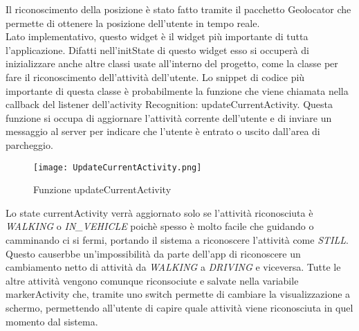 \documentclass[../../Report.tex]{subfiles}
\begin{document}
Il riconoscimento della posizione è stato fatto tramite il pacchetto Geolocator che permette di ottenere la posizione dell'utente in tempo reale.\\

Lato implementativo, questo widget è il widget più importante di tutta l'applicazione. Difatti nell'initState di questo widget esso si occuperà di inizializzare anche altre classi usate all'interno del progetto, come la classe per fare il riconoscimento dell'attività dell'utente. Lo snippet di codice più importante di questa classe è probabilmente la funzione che viene chiamata nella callback del listener dell'activity Recognition: updateCurrentActivity. Questa funzione si occupa di aggiornare l'attività corrente dell'utente e di inviare un messaggio al server per indicare che l'utente è entrato o uscito dall'area di parcheggio.\\
\begin{figure}[H]
  \centering
  \texttt{[image: UpdateCurrentActivity.png]}
  \caption{Funzione updateCurrentActivity}
\end{figure}
Lo state currentActivity verrà aggiornato solo se l'attività riconosciuta è \emph{WALKING} o \emph{IN\_VEHICLE} poichè spesso è molto facile che guidando o camminando ci si fermi, portando il sistema a riconoscere l'attività come \emph{STILL}. Questo causerbbe un'impossibilità da parte dell'app di riconoscere un cambiamento netto di attività da \emph{WALKING} a \emph{DRIVING} e viceversa. Tutte le altre attività vengono comunque riconsociute e salvate nella variabile markerActivity che, tramite uno switch permette di cambiare la visualizzazione a schermo, permettendo all'utente di capire quale attività viene riconosciuta in quel momento dal sistema.\\
\end{document}
